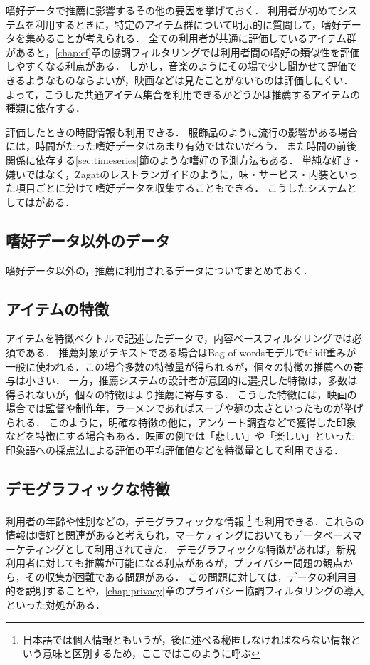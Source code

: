 嗜好データで推薦に影響するその他の要因を挙げておく．
利用者が初めてシステムを利用するときに，特定のアイテム群について明示的に質問して，嗜好データを集めることが考えられる．
全ての利用者が共通に評価しているアイテム群があると，\ref{chap:cf}章の協調フィルタリングでは利用者間の嗜好の類似性を評価しやすくなる利点がある．
しかし，音楽のようにその場で少し聞かせて評価できるようなものならよいが，映画などは見たことがないものは評価しにくい．
よって，こうした共通アイテム集合を利用できるかどうかは推薦するアイテムの種類に依存する．

評価したときの時間情報も利用できる．
服飾品のように流行の影響がある場合には，時間がたった嗜好データはあまり有効ではないだろう．
また時間の前後関係に依存する\ref{sec:timeseries}節のような嗜好の予測方法もある．
単純な好き・嫌いではなく，Zagatのレストランガイドのように，味・サービス・内装といった項目ごとに分けて嗜好データを収集することもできる．
こうしたシステムとしては\cite{ieeem:07:02}がある．

\subsection{嗜好データ以外のデータ}
\label{sec:featuredata}

嗜好データ以外の，推薦に利用されるデータについてまとめておく．

\subsection{アイテムの特徴}

アイテムを特徴ベクトルで記述したデータで，内容ベースフィルタリングでは必須である．
推薦対象がテキストである場合はBag-of-wordsモデルでtf-idf重み\cite{jb:012:00}が一般に使われる．この場合多数の特徴量が得られるが，個々の特徴の推薦への寄与は小さい．
一方，推薦システムの設計者が意図的に選択した特徴は，多数は得られないが，個々の特徴はより推薦に寄与する．
こうした特徴には，映画の場合では監督や制作年，ラーメンであればスープや麺の太さといったものが挙げられる．
このように，明確な特徴の他に，アンケート調査などで獲得した印象などを特徴にする場合もある．映画の例では「悲しい」や「楽しい」といった印象語への採点法による評価の平均評価値などを特徴量として利用できる．

\subsection{デモグラフィックな特徴}

利用者の年齢や性別などの，デモグラフィックな情報%
\footnote{日本語では個人情報ともいうが，後に述べる秘匿しなければならない情報という意味と区別するため，ここではこのように呼ぶ}%
も利用できる\cite{ej:050}．これらの情報は嗜好と関連があると考えられ，マーケティングにおいてもデータベースマーケティングとして利用されてきた\cite{dmkd:01:01}．
デモグラフィックな特徴があれば，新規利用者に対しても推薦が可能になる利点があるが，プライバシー問題の観点から，その収集が困難である問題がある．
この問題に対しては，データの利用目的を説明すること\cite{sigir:01:01}や，\ref{chap:privacy}章のプライバシー協調フィルタリングの導入といった対処がある．

